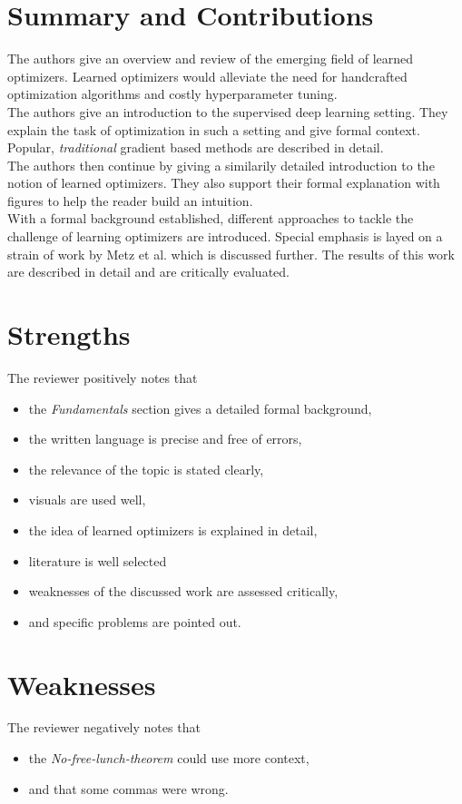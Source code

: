 \documentclass[a4paper]{scrartcl}
\begin{document}
	
\section*{Summary and Contributions}
The authors give an overview and review of the emerging field of learned optimizers. Learned optimizers would alleviate the need for handcrafted optimization algorithms and costly hyperparameter tuning.\\
The authors give an introduction to the supervised deep learning setting. They explain the task of optimization in such a setting and give formal context. Popular, \textit{traditional} gradient based methods are described in detail.\\
The authors then continue by giving a similarily detailed introduction to the notion of learned optimizers. They also support their formal explanation with figures to help the reader build an intuition. \\
With a formal background established, different approaches to tackle the challenge of learning optimizers are introduced. Special emphasis is layed on a strain of work by Metz et al. which is discussed further. The results of this work are described in detail and are critically evaluated.


\section*{Strengths}
The reviewer positively notes that
\begin{itemize}
	\item the \textit{Fundamentals} section gives a detailed formal background,
	\item the written language is precise and free of errors,
	\item the relevance of the topic is stated clearly,
	\item visuals are used well,
	\item the idea of learned optimizers is explained in detail,
	\item literature is well selected
	\item weaknesses of the discussed work are assessed critically,
	\item and specific problems are pointed out.
\end{itemize}


\section*{Weaknesses}
The reviewer negatively notes that
\begin{itemize}
	\item the \textit{No-free-lunch-theorem} could use more context,
	\item and that some commas were wrong.
\end{itemize}
\end{document}
